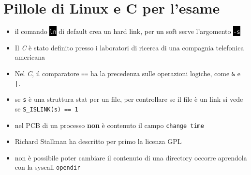 \documentclass[12pt, letterpaper]{article}
\newcommand{\code}[1]{\colorbox{light-gray}{\texttt{#1}}}
\newcommand{\shelll}[1]{\colorbox{black}{\textcolor{white}{\texttt{#1}}}}
\newcommand{\codee}[1]{\colorbox{white}{\texttt{#1}}}
\begin{document}
\section{Pillole di Linux e C per l'esame}
\begin{itemize}
    \item il comando \shelll{ln} di default crea un hard link, per un soft serve l'argomento \shelll{-s}
    \item Il \textit{C} è stato definito  presso i laboratori di ricerca di una compagnia telefonica americana
    \item Nel \textit{C}, il comparatore \code{==} ha la precedenza sulle operazioni logiche, come \code{\&} e \code{|}.
    \item se \code{s} è una struttura stat per un file, per controllare se il file  è un link si vede se \code{S\_ISLINK(s) == 1}
    \item nel PCB di un processo \textbf{non} è contenuto il campo \codee{change time}  
    \item Richard Stallman ha descritto per primo la licenza GPL
    \item non è possibile poter cambiare il contenuto di una directory occorre aprendola con la syscall \code{opendir}  
\end{itemize}
\end{document}
